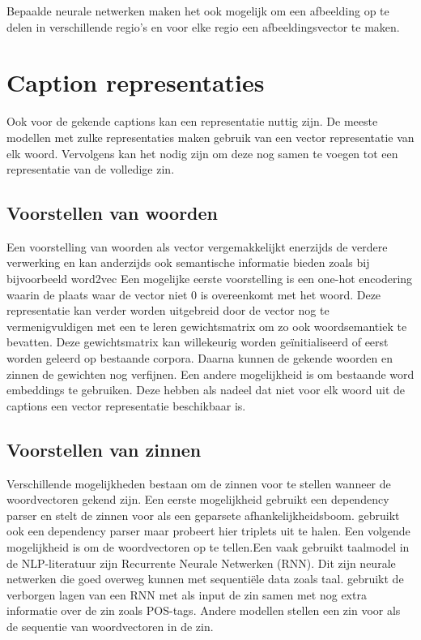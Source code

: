 Bepaalde neurale netwerken maken het ook mogelijk om een afbeelding op te delen in verschillende regio's en voor elke regio een afbeeldingsvector te maken.\cite{karpathy}\cite{Fang}

\section{Caption representaties}
Ook voor de gekende captions kan een representatie nuttig zijn. De meeste modellen met zulke representaties maken gebruik van een vector representatie van elk woord. Vervolgens kan het nodig zijn om deze nog samen te voegen tot een representatie van de volledige zin.

\subsection{Voorstellen van woorden}
 Een voorstelling van woorden als vector vergemakkelijkt enerzijds de verdere verwerking en kan anderzijds ook semantische informatie bieden zoals bij bijvoorbeeld word2vec\cite{mikolov}
 Een mogelijke eerste voorstelling is een one-hot encodering waarin de plaats waar de vector niet 0 is overeenkomt met het woord. Deze representatie kan verder worden uitgebreid door de vector nog te vermenigvuldigen met een te leren gewichtsmatrix om zo ook woordsemantiek te bevatten.  Deze gewichtsmatrix kan willekeurig worden ge\"initialiseerd of eerst worden geleerd op bestaande corpora.\cite{Lebret}\cite{Vinyals}\cite{Mao} Daarna kunnen de gekende woorden en zinnen de gewichten nog verfijnen.  Een andere mogelijkheid is om bestaande word embeddings te gebruiken.\cite{mikolov} Deze hebben als nadeel dat niet voor elk woord uit de captions een vector representatie beschikbaar is. 
 
 \subsection{Voorstellen van zinnen}
 Verschillende mogelijkheden bestaan om de zinnen voor te stellen wanneer de woordvectoren gekend zijn. Een eerste mogelijkheid gebruikt een dependency parser en stelt de zinnen voor als een geparsete afhankelijkheidsboom.\cite{Socher}\cite{Karpathy} gebruikt ook een dependency parser maar probeert hier triplets uit te halen. Een volgende mogelijkheid is om de woordvectoren op te tellen.\cite{lebret}Een vaak gebruikt taalmodel in de NLP-literatuur zijn Recurrente Neurale Netwerken (RNN).\cite{mikolov maar de RNN} Dit zijn neurale netwerken die goed overweg kunnen met sequenti\"ele data zoals taal.\cite{Kiros} gebruikt de verborgen lagen van een RNN met als input de zin samen met nog extra informatie over de zin zoals POS-tags. Andere modellen stellen een zin voor als de sequentie van woordvectoren in de zin.
 
